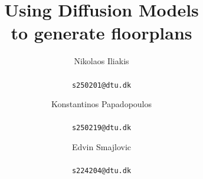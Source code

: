 \documentclass[10pt,twocolumn,letterpaper]{article}
\title{Using Diffusion Models \\ to generate floorplans}
\author{Nikolaos Iliakis\\
\\
{\tt\small s250201@dtu.dk}
\and
Konstantinos Papadopoulos\\
\\
{\tt\small s250219@dtu.dk}
\and
Edvin Smajlovic\\
\\
{\tt\small s224204@dtu.dk}
}
\begin{document}
\maketitle





%


{
    \small
    
    
    
}
\end{document}
